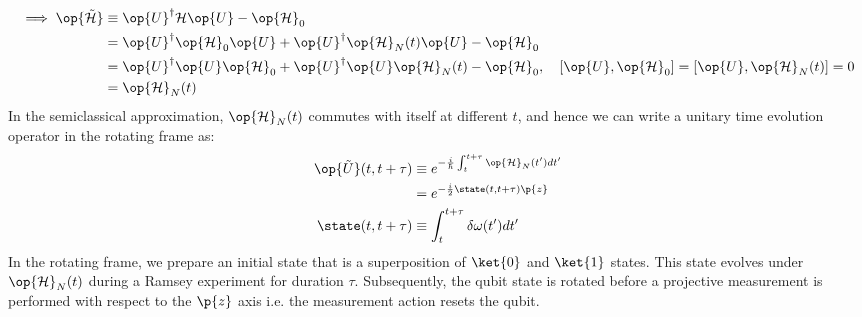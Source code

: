 \begin{align}
\implies \op{\tilde{\mathcal{H}}} &\equiv \op{U}^\dagger \mathcal{H} \op{U} -\op{\mathcal{H}}_0 \\
& = \op{U}^\dagger \op{\mathcal{H}}_0\op{U}  + \op{U}^\dagger \op{\mathcal{H}}_{N}(t) \op{U} -\op{\mathcal{H}}_0 \\
& = \op{U}^\dagger \op{U} \op{\mathcal{H}}_0  + \op{U}^\dagger \op{U} \op{\mathcal{H}}_{N}(t)  -\op{\mathcal{H}}_0, \quad [\op{U}, \op{\mathcal{H}}_0 ] = [\op{U}, \op{\mathcal{H}}_{N}(t) ] = 0 \\
& = \op{\mathcal{H}}_{N}(t)
\end{align}
In the semiclassical approximation,  $\op{\mathcal{H}}_{N}(t)$ commutes with itself at different $t$, and hence we can write a unitary time evolution operator in the rotating frame as:
\begin{align}
\op{\tilde{U}}(t, t + \tau) &\equiv  e^{-\frac{i}{\hbar}  \int_{t}^{t + \tau} \op{\mathcal{H}}_{N}(t') dt'  } \\
& = e^{-\frac{i}{2} \state(t, t + \tau) \p{z} } \\
\state(t, t + \tau) & \equiv  \int_{t}^{t + \tau} \delta \omega (t') dt' \label{eqn:app:phases}
\end{align}
In the rotating frame, we prepare an initial state that is a superposition of $\ket{0}$ and $\ket{1}$ states. This state evolves under $\op{\mathcal{H}}_{N} (t)$ during a Ramsey experiment for duration $\tau$.  Subsequently, the qubit state is rotated before a projective measurement is performed with respect to the $\p{z}$ axis i.e. the measurement action resets the qubit. 


